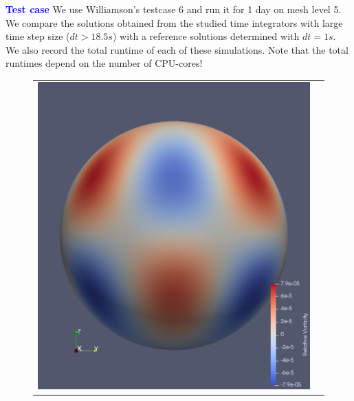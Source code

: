 \documentclass[a4paper]{article}
\begin{document}
\noindent \textcolor{blue}{\textbf{Test case}}
We use Williamson's testcase 6 and run it for 1 day on mesh level 5.
We compare the solutions obtained from the studied time integrators with
large time step size ($dt >18.5s$) with a reference solutions determined with $dt=1s$.
We also record the total runtime of each of these simulations.
Note that the total runtimes depend on the number of CPU-cores!
\vspace{0.6cm}

 \begin{figure}[t]\centering
 \begin{tabular}{cc}
 \hspace{-0em}\includegraphics[scale=0.125]{Images/vorticity_0.png} &

\end{tabular}
\end{figure}
\end{document}
